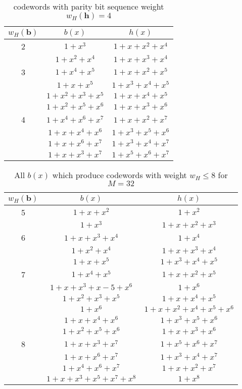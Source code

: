  \begin{table*}[h!]
 
 \caption{codewords with parity bit sequence weight $w_H(\textbf{h})=4$}
\centering
 \begin{tabular}{c c c} 
 \hline
 $w_H(\textbf{b})$ & $b(x)$ & $h(x)$ \\ [0.5ex] 
 \hline\hline
 2 &  $1+x^3$ & $1+x+x^2+x^4$\\ 
 \hline 
  & $1+x^2+x^4$ &  $1+x+x^3+x^4$ \\
   3 &  $1+x^4+x^5$ & $1+x+x^2+x^5$ \\
  &  $1+x+x^5$ & $1+x^3+x^4+x^5$ \\
  \hline 
  & $1+x^2+x^3+x^5$ & $1+x+x^4+x^5$ \\
  &  $1+x^2+x^5+x^6$ & $1+x+x^3+x^6$ \\
 4 & $1+x^4+x^6+x^7$ & $1+x+x^2+x^7$\\ 
  &  $1+x+x^4+x^6$ & $1+x^{3}+x^5+x^6$ \\ 
  &  $1+x+x^6+x^7$ & $1+x^{3}+x^4+x^7$ \\  
  &  $1+x+x^3+x^7$ & $1+x^5+x^6+x^7$ \\ 
 [1ex]
 \hline
 \end{tabular}
 \label{tab2}
\end{table*}

\begin{table*}[h!]
 \caption{All $b(x)$ which produce codewords with weight $w_H \leq 8$ for $M=32$}
\centering
 \begin{tabular}{c c c} 
 \hline
 $w_H(\textbf{b})$ & $b(x)$ & $h(x)$ \\ [0.5ex] 
 \hline\hline
 5 &  $1+x+x^2$ & $1+x^2$\\ 
 \hline 
  & $1+x^3$ &  $1+x+x^2+x^3$ \\
   6 &  $1+x+x^3+x^4$ & $1+x^4$ \\
  \hline 
  & $1+x^2+x^4$ & $1+x+x^3+x^4$ \\
  &  $1+x+x^5$ & $1+x^3+x^4+x^5$ \\
 7 & $1+x^4+x^5$ & $1+x+x^2+x^5$\\ 
  &  $1+x+x^3+x-5+x^6$ & $1+x^6$ \\ 
  \hline
  &$1+x^2+x^3+x^5$ & $1+x+x^4+x^5$ \\
  & $1+x^6$ & $1+x+x^2+x^4+x^5+x^6$\\
  & $1 +x +x^4+x^6$ & $1+x^3+x^5+x^6$ \\
  & $1 +x^2 +x^5 +x^6$ & $1+x+x^3+x^6$\\
  8 & $1+x+x^3+x^7$ & $1+x^5+x^6+x^7$ \\
  & $1+ x+x^6+x^7$ & $1+x^3+x^4+x^7$\\
  & $1+x^4+x^6+x^7$ & $1+x+x^2+x^7$\\
  & $1 +x +x^3 +x^5 +x^7 +x^8$ & $1+x^8$\\
 [1ex]
 \hline
 \end{tabular}
 \label{tab3}
\end{table*}